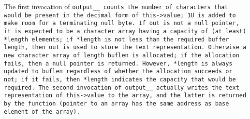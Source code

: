 The first invocation of \tt{output__} counts the number of characters
that would be present in the decimal form of \tt{this->value};
\tt{1U} is added to make room for a terminating null byte.
If \tt{out} is not a null pointer, it is expected to be a character array having
a capacity of (at least) \tt{*length} elements; if \tt{*length} is not less than
the required buffer length, then \tt{out} is used to store the text representation.
Otherwise a new character array of length \tt{buflen} is allocated;
if the allocation fails, then a null pointer is returned.
However, \tt{*length} is always updated to \tt{buflen}
regardless of whether the allocation succeeds or not; if it fails,
then \tt{*length} indicates the capacity that would be required.
The second invocation of \tt{output__} actually writes the text representation
of \tt{this->value} to the array, and the latter is returned by the function
(pointer to an array has the same address as base element of the array).
